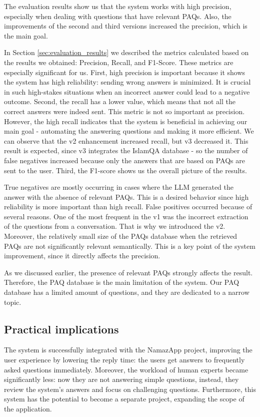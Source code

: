 The evaluation results show us that the system works with high precision, especially when dealing with questions that have relevant PAQs. Also, the improvements of the second and third versions increased the precision, which is the main goal.

In Section \ref{sec:evaluation_results} we described the metrics calculated based on the results we obtained: Precision, Recall, and F1-Score. These metrics are especially significant for us. First, high precision is important because it shows the system has high reliability: sending wrong answers is minimized. It is crucial in such high-stakes situations when an incorrect answer could lead to a negative outcome. Second, the recall has a lower value, which means that not all the correct answers were indeed sent. This metric is not so important as precision. However, the high recall indicates that the system is beneficial in achieving our main goal - automating the answering questions and making it more efficient. We can observe that the v2 enhancement increased recall, but v3 decreased it. This result is expected, since v3 integrates the IslamQA database - so the number of false negatives increased because only the answers that are based on PAQs are sent to the user. Third, the F1-score shows us the overall picture of the results.  

True negatives are mostly occurring in cases where the LLM generated the answer with the absence of relevant PAQs. This is a desired behavior since high reliability is more important than high recall.
False positives occurred because of several reasons. One of the most frequent in the v1 was the incorrect extraction of the questions from a conversation. That is why we introduced the v2. Moreover, the relatively small size of the PAQs database when the retrieved PAQs are not significantly relevant semantically. This is a key point of the system improvement, since it directly affects the precision.

As we discussed earlier, the presence of relevant PAQs strongly affects the result. Therefore, the PAQ database is the main limitation of the system. Our PAQ database has a limited amount of questions, and they are dedicated to a narrow topic.

\subsection{Practical implications}

The system is successfully integrated with the NamazApp project, improving the user experience by lowering the reply time: the users get answers to frequently asked questions immediately. Moreover, the workload of human experts became significantly less: now they are not answering simple questions, instead, they review the system's answers and focus on challenging questions. Furthermore, this system has the potential to become a separate project, expanding the scope of the application.

